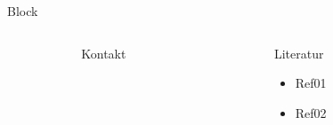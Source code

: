 \begin{frame}[t]
\begin{columns}[t]
\begin{column}{.465\textwidth}
\begin{block}{Block}
     
   
   
\end{block}


\end{column} %



\begin{column}{.025\textwidth}\end{column} %

\end{columns} %


\begin{columns}[t] %

\begin{column}{.025\textwidth}\end{column} %

\begin{column}{.465\textwidth} %


\begin{block}{Kontakt}

\end{block}

\end{column} %

\begin{column}{.025\textwidth}\end{column} %

\begin{column}{.465\textwidth}

\begin{block}{Literatur}

\begin{itemize}

\item Ref01
\item Ref02

\end{itemize}


\end{block}

\end{column}

\begin{column}{.025\textwidth}\end{column} %


\end{columns}
\end{frame}
